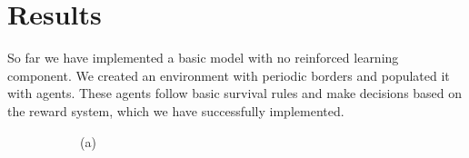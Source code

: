 \documentclass[9pt]{pnas-new}
\begin{document}
\section*{Results}

So far we have implemented a basic model with no reinforced learning component. We created an environment with periodic borders and populated it with agents. These agents follow basic survival rules and make decisions based on the reward system, which we have successfully implemented.

\begin{figure}[ht]
	\centering
	\begin{subfigure}{0.30\textwidth}
		\centering
		\vspace{0.5em}
		\centering (a)
	\end{subfigure}
	\hfill
	\begin{subfigure}{0.30\textwidth}
		\centering

\end{subfigure}
\end{figure}
\end{document}
